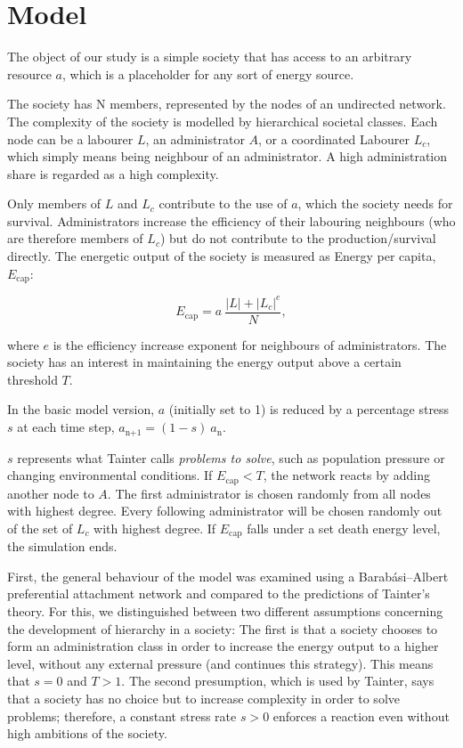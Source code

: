 
\section*{Model}
The object of our study is a simple society that has access to an arbitrary resource $a$, which is a placeholder for any sort of energy source.

The society has N members, represented by the nodes of an undirected network. The complexity of the society is modelled by hierarchical societal classes. Each node can be a labourer $L$, an administrator $A$, or a coordinated Labourer $L_c$, which simply means being neighbour of an administrator. A high administration share is regarded as a high complexity.

Only members of $L$ and $L_c$ contribute to the use of $a$, which the society needs for survival. Administrators increase the efficiency of their labouring neighbours (who are therefore members of $L_c$) but do not contribute to the production/survival directly. The energetic output of the society is measured as Energy per capita, $E_{\text{cap}}$:

\begin{equation}
    E_{\text{cap}} = a \ \frac{|L| + |L_c|^e}{N},
\end{equation}

where $e$ is the efficiency increase exponent for neighbours of administrators. The society has an interest in maintaining the energy output above a certain threshold $T$.

In the basic model version, $a$ (initially set to 1) is reduced by a percentage stress $s$ at each time step, $a_{\text{n+1}} = (1-s)\  a_{\text{n}}$.

$s$ represents what Tainter calls \textit{problems to solve}, such as population pressure or changing environmental conditions. If $E_{\text{cap}} < T$, the network reacts by adding another node to $A$. The first administrator is chosen randomly from all nodes with highest degree. Every following administrator will be chosen randomly out of the set of $L_c$ with highest degree.
If $E_{\text{cap}}$ falls under a set death energy level, the simulation ends.

First, the general behaviour of the model was examined using a Barabási–Albert preferential attachment network and compared to the predictions of Tainter's theory. For this, we distinguished between two different assumptions concerning the development of hierarchy in a society: The first is that a society chooses to form an administration class in order to increase the energy output to a higher level, without any external pressure (and continues this strategy). This means that $s = 0$ and $T>1$. The second presumption, which is used by Tainter, says that a society has no choice but to increase complexity in order to solve problems; therefore, a constant stress rate $s > 0$ enforces a reaction even without high ambitions of the society.

